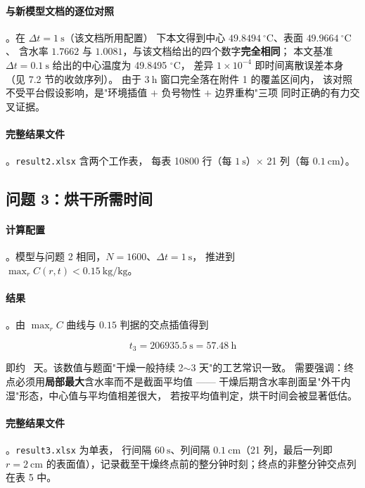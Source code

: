 \paragraph{与新模型文档的逐位对照}。在 $\Delta t=1\ \mathrm{s}$（该文档所用配置）
下本文得到中心 $49.8494\ ^\circ\mathrm{C}$、表面 $49.9664\ ^\circ\mathrm{C}$、
含水率 $1.7662$ 与 $1.0081$，与该文档给出的四个数字\textbf{完全相同}；
本文基准 $\Delta t=0.1\ \mathrm{s}$ 给出的中心温度为 49.8495 $^\circ$C，
差异 $1\times10^{-4}$ 即时间离散误差本身（见 7.2 节的收敛序列）。
由于 $3\ \mathrm{h}$ 窗口完全落在附件 1 的覆盖区间内，
该对照不受平台假设影响，是"环境插值 $+$ 负号物性 $+$ 边界重构"三项
同时正确的有力交叉证据。

\paragraph{完整结果文件}。\texttt{result2.xlsx} 含两个工作表，
每表 10800 行（每 $1\ \mathrm{s}$）$\times$ 21 列（每 $0.1\ \mathrm{cm}$）。

\subsection{问题 3：烘干所需时间}

\paragraph{计算配置}。模型与问题 2 相同，$N=1600$、$\Delta t=1\ \mathrm{s}$，
推进到 $\max_r C(r,t)<0.15\ \mathrm{kg/kg}$。



\paragraph{结果}。由 $\max_r C$ 曲线与 $0.15$ 判据的交点插值得到

\begin{equation}
\boxed{\ t_3 = \text{206935.5}\ \mathrm{s} = \text{57.48}\ \mathrm{h}\ }
\end{equation}

即约 \ 天。该数值与题面"干燥一般持续 2$\sim$3 天"的工艺常识一致。
需要强调：终点必须用\textbf{局部最大}含水率而不是截面平均值 ——
干燥后期含水率剖面呈"外干内湿"形态，中心值与平均值相差很大，
若按平均值判定，烘干时间会被显著低估。

\paragraph{完整结果文件}。\texttt{result3.xlsx} 为单表，
行间隔 $60\ \mathrm{s}$、列间隔 $0.1\ \mathrm{cm}$（21 列，最后一列即 $r=2\ \mathrm{cm}$
的表面值），记录截至干燥终点前的整分钟时刻；终点的非整分钟交点列在表 5 中。

